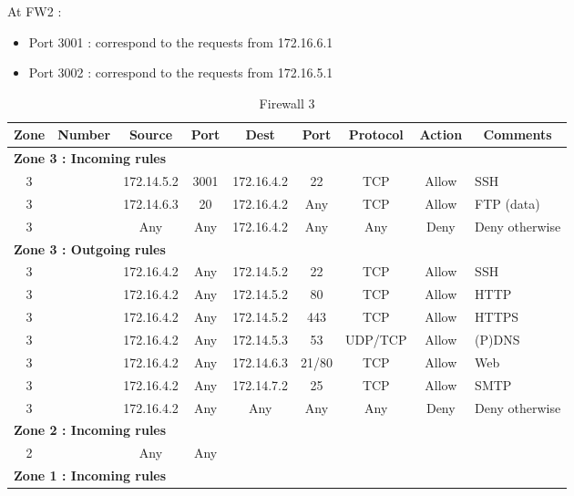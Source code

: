 \documentclass[a4paper,titlepage]{article}
\begin{document}
At FW2 :
\begin{itemize}
	\item Port 3001 : correspond to the requests from 172.16.6.1
	\item Port 3002 : correspond to the requests from 172.16.5.1
\end{itemize}

\begin{table}[h]
	\center
	\begin{tabular}{c|c|cc|cc|ccl}
		Zone & Number & Source & Port & Dest & Port & Protocol & Action & \multicolumn{1}{c}{Comments}\\
		\hline
		\multicolumn{9}{l}{\textbf{Zone 3 : Incoming rules}}\\
		3 &  & 172.14.5.2 & 3001 & 172.16.4.2 & 22 & TCP & Allow & SSH\\
		3 &  & 172.14.6.3 & 20 & 172.16.4.2 & Any & TCP & Allow & FTP (data)\\
		3 &  & Any & Any & 172.16.4.2 & Any & Any & Deny & Deny otherwise\\

		\hline
		\multicolumn{9}{l}{\textbf{Zone 3 : Outgoing rules}}\\
		3 &  & 172.16.4.2 & Any & 172.14.5.2 & 22 & TCP & Allow & SSH\\
		3 &  & 172.16.4.2 & Any & 172.14.5.2 & 80 & TCP & Allow & HTTP\\
		3 &  & 172.16.4.2 & Any & 172.14.5.2 & 443 & TCP & Allow & HTTPS\\
		3 &  & 172.16.4.2 & Any & 172.14.5.3 & 53 & UDP/TCP & Allow & (P)DNS\\
		3 &  & 172.16.4.2 & Any & 172.14.6.3 & 21/80 & TCP & Allow & Web\\
		3 &  & 172.16.4.2 & Any & 172.14.7.2 & 25 & TCP & Allow & SMTP\\
		3 &  & 172.16.4.2 & Any & Any & Any & Any & Deny & Deny otherwise\\

		\hline
		\multicolumn{9}{l}{\textbf{Zone 2 : Incoming rules}}\\
		2 &  & Any & Any &

		\hline
		\multicolumn{9}{l}{\textbf{Zone 2 : Outgoing rules}}\\

		\hline
		\multicolumn{9}{l}{\textbf{Zone 1 : Incoming rules}}\\


	\end{tabular}
	\caption{Firewall 3}
\end{table}
\end{document}
